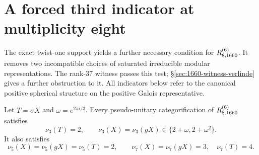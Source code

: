 \section{A forced third indicator at multiplicity eight}
\label{sec:1660-forced-third-indicator}

The exact twist-one support yields a further necessary condition for
$R^{(6)}_{8,1660}$. It removes two incompatible choices of saturated
irreducible modular representations. The rank-$37$ witness passes this
test; \S\ref{sec:1660-witness-verlinde} gives a further obstruction to it.
All indicators below refer to the canonical positive spherical structure
on the positive Galois representative.

\begin{proposition}\label{prop:1660-forced-third-indicator}
Let $T=\sigma X$ and $\omega=e^{2\pi i/3}$. Every pseudo-unitary
categorification of $R^{(6)}_{8,1660}$ satisfies
\[
 \nu_3(T)=2,\qquad
 \nu_3(X)=\nu_3(gX)\in\{2+\omega,2+\omega^2\}.
\]
It also satisfies
\[
 \nu_5(X)=\nu_5(gX)=\nu_5(T)=2,\qquad
 \nu_7(X)=\nu_7(gX)=3,\quad\nu_7(T)=4.
\]
\end{proposition}
